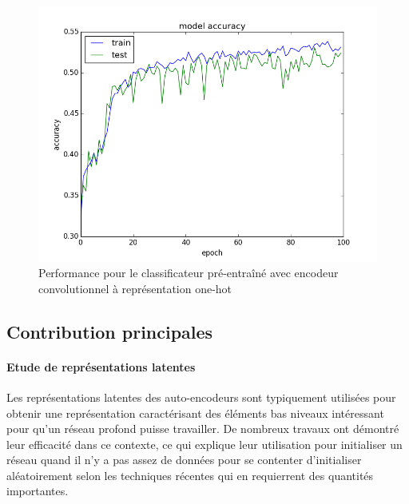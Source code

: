 \documentclass[a4paper, 11pt, onecolumn]{article}
\begin{document}
\begin{figure}[!tbp]
\begin{minipage}[b]{0.3\textwidth}
    \includegraphics[width=\textwidth]{ConvClass}
    \caption{Performance pour le classificateur pré-entraîné avec encodeur
      convolutionnel à représentation one-hot}
  \end{minipage}
\end{figure}

\subsection{Contribution principales}

\paragraph{Etude de représentations latentes}

Les représentations latentes des auto-encodeurs sont typiquement utilisées pour
obtenir une représentation caractérisant des éléments bas niveaux intéressant
pour qu'un réseau profond puisse travailler. De nombreux travaux ont démontré
leur efficacité dans ce contexte, ce qui explique leur utilisation pour
initialiser un réseau quand il n'y a pas assez de données pour se contenter
d'initialiser aléatoirement selon les techniques récentes qui en requierrent des
quantités importantes.
\end{document}
